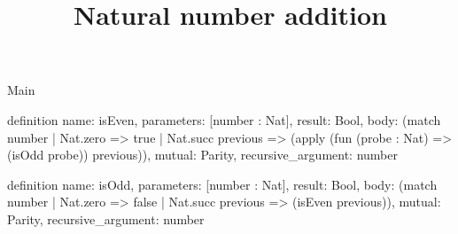 \begin{lexlean}{Main}
\title{Natural number addition}
\begin{semanticmodule}
definition{
  name: isEven,
  parameters: [number : Nat],
  result: Bool,
  body: (match number
    | Nat.zero => true
    | Nat.succ previous => (apply (fun (probe : Nat) => (isOdd probe)) previous)),
  mutual: Parity,
  recursive_argument: number
}

definition{
  name: isOdd,
  parameters: [number : Nat],
  result: Bool,
  body: (match number | Nat.zero => false | Nat.succ previous => (isEven previous)),
  mutual: Parity,
  recursive_argument: number
}
\end{semanticmodule}
\end{lexlean}
